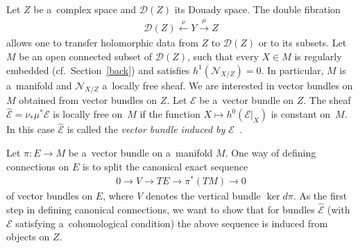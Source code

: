 \documentclass[pdftex]{sigma}
\numberwithin{equation}{section}
\begin{document}
Let $Z$ be a~complex space and ${\mathcal{D}}(Z)$ its Douady space.
The double f\/ibration
\begin{gather*}
{\mathcal{D}}(Z)\stackrel{\nu}{\longleftarrow} Y \stackrel{\mu}{\longrightarrow} Z
\end{gather*}
allows one to transfer holomorphic data from $Z$ to ${\mathcal{D}}(Z)$ or to its subsets.
Let $M$ be an open connected subset of ${\mathcal{D}}(Z)$, such that every $X\in M$ is regularly embedded (cf.\
Section~\ref{back}) and satisf\/ies $h^1({\mathcal{N}}_{X/Z})=0$.
In particular, $M$ is a~manifold and ${\mathcal{N}}_{X/Z}$ a~locally free sheaf.
We are interested in vector bundles on $M$ obtained from vector bundles on $Z$.
Let ${\mathcal{E}}$ be a~vector bundle on $Z$.
The sheaf $\widehat{\mathcal{E}}=\nu_\ast\mu^\ast {\mathcal{E}}$ is locally free on~$M$ if the function $X\mapsto
h^0({\mathcal{E}}|_{X})$ is constant on~$M$.
In this case $\widehat{\mathcal{E}}$ is called the {\em vector bundle induced by ${\mathcal{E}}$}~\cite{HM}.

Let $\pi:E\to M$ be a~vector bundle on a~manifold $M$.
One way of def\/ining connections on $E$ is to split the canonical exact sequence
\begin{gather}
0\to V\to TE\to \pi^\ast(TM)\to 0
\label{seq1.5}
\end{gather}
of vector bundles on $E$, where $V$ denotes the vertical bundle $\ker d {\pi}$.
As the f\/irst step in def\/ining canonical connections, we want to show that for bundles $\widehat{\mathcal{E}}$ (with
${\mathcal{E}}$ satisfying a~cohomological condition) the above sequence is induced from objects on $Z$.
\end{document}

